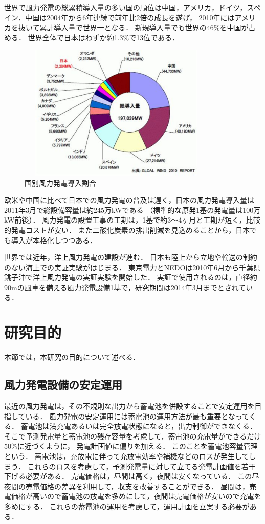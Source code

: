 \documentclass[a4paper,12pt,showkeys]{jreport}
\begin{document}
世界で風力発電の総累積導入量の多い国の順位は中国，アメリカ，ドイツ，スペイン．中国は2004年から6年連続で前年比2倍の成長を遂げ，
2010年にはアメリカを抜いて累計導入量で世界一となる．
新規導入量でも世界の46\%を中国が占める．
世界全体で日本はわずか約1.3\%で13位である．

\begin{figure}[h]
\centering
\includegraphics[width=9.5cm,height=6.5cm, clip]{sekai.eps}
\caption{国別風力発電導入割合\cite{エネルギー}}
\label{fig:sekai}
\end{figure}

欧米や中国に比べて日本での風力発電の普及は遅く，日本の風力発電導入量は2011年3月で総設備容量は約245万kWである
（標準的な原発1基の発電量は100万kW前後）．
風力発電の設置工事の工期は，1基で約3～4ヶ月と工期が短く，比較的発電コストが安い．
また二酸化炭素の排出削減を見込めることから，日本でも導入が本格化しつつある\cite{エネルギー}．

世界では近年，洋上風力発電の建設が進む．
日本も陸上から立地や輸送の制約のない海上での実証実験がはじまる．
東京電力とNEDOは2010年6月から千葉県銚子沖で洋上風力発電の実証実験を開始した．
実証で使用されるのは，直径約90mの風車を備える風力発電設備1基で，研究期間は2014年3月までとされている．



\chapter{研究目的}

本節では，本研究の目的について述べる．

\section{風力発電設備の安定運用}

最近の風力発電は，その不規則な出力から蓄電池を併設することで安定運用を目指している．
風力発電の安定運用には蓄電池の運用方法が最も重要となってくる．
蓄電池は満充電あるいは完全放電状態になると，出力制御ができなくる．
そこで予測発電量と蓄電池の残存容量を考慮して，蓄電池の充電量ができるだけ50\%に近づくように，
発電計画値に偏りを加える．
このことを蓄電池容量管理という\cite{風力}．
蓄電池は，充放電に伴って充放電効率や補機などのロスが発生してしまう．
これらのロスを考慮して，予測発電量に対して立てる発電計画値を若干下げる必要がある．
売電価格は，昼間は高く，夜間は安くなっている．
この昼夜間の売電価格の差異を利用して，収支を改善することができる．
昼間は，売電価格が高いので蓄電池の放電を多めにして，夜間は売電価格が安いので充電を多めにする．
これらの蓄電池の運用を考慮して，運用計画を立案する必要がある．
\end{document}
